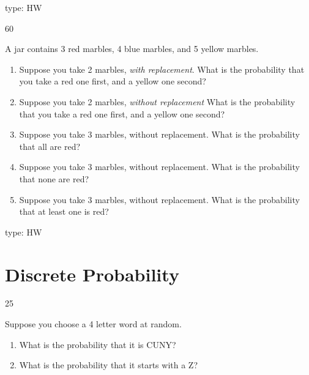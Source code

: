 \documentclass[12 pt]{article}
\begin{document}
\begin{itemize}
{\begin{enumerate}
\end{enumerate}

}{


}{}{type: HW}





 \ex
{}{60}
{
A jar contains 3 red marbles, 4 blue marbles, and 5 yellow marbles.

\begin{enumerate}

\item Suppose you take 2 marbles, \emph{with replacement}.  
What is the probability that you take a red one first, and a yellow one second?

\item Suppose you take 2 marbles, \emph{without replacement}
What is the probability that you take a red one first, and a yellow one second?


\item  Suppose you take 3 marbles, without replacement.  What is the probability that all are red?

\item  Suppose you take 3 marbles, without replacement.  What is the probability that none are red?

\item  Suppose you take 3 marbles, without replacement.  What is the probability that at least one is red?

\end{enumerate}


}{


}{}{type: HW}



\section{Discrete Probability}

 \ex
{}{25}
{
Suppose you choose a 4 letter word at random. 
\begin{enumerate}

\item What is the probability that it is CUNY?

\item
 What is the probability that it starts with a Z?



\end{enumerate}


}{


}
\end{itemize}
\end{document}
